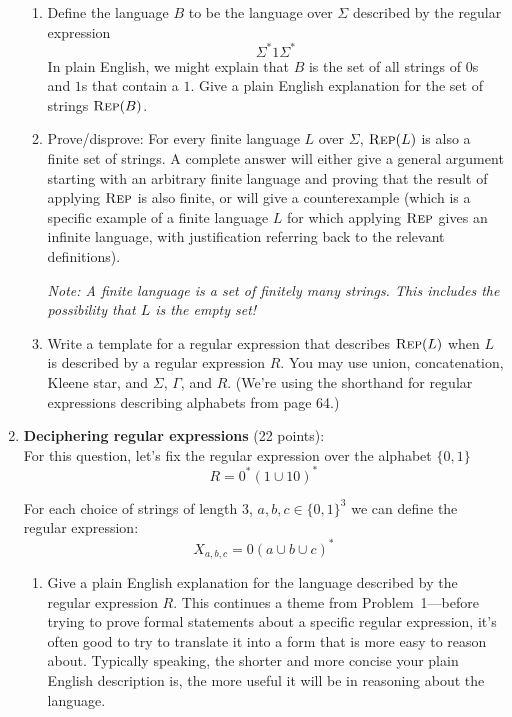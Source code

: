 \begin{enumerate}[wide, labelwidth=!, labelindent=0pt]
\begin{enumerate}
    \item\gradeCompleteFirst Define the language $B$ to 
    be the language over $\Sigma$ described by the regular expression 
    \[
    \Sigma^* 1 \Sigma^*
    \] 
    In plain English, we might explain that $B$ is the set of all 
    strings of $0$s and $1$s that contain a $1$. Give a plain English 
    explanation for the set of strings $\textsc{Rep}(B)$.
    
    \item\gradeCorrect Prove/disprove:
    For every finite language $L$ over $\Sigma$, $\textsc{Rep}(L)$ is also a finite
    set of strings.  A complete answer will either give a general
    argument starting with an arbitrary finite language and proving 
    that the result of applying $\textsc{Rep}$ is also finite, or will give a 
    counterexample (which is a specific example of a finite language 
    $L$ for which applying $\textsc{Rep}$ gives an infinite language, with 
    justification referring back to the relevant definitions).

    {\it Note: A finite language is a set of finitely many strings. 
    This includes the possibility that $L$ is the empty set!}

    \item\gradeComplete Write a template for a regular expression that describes $\textsc{Rep}(L)$
    when $L$ is described by a regular expression $R$.
    You may use union, concatenation, Kleene star, and 
    $\Sigma$, $\Gamma$, and $R$.  (We're using the shorthand for regular expressions
    describing alphabets from page 64.)

    \end{enumerate}

    \item \textbf{Deciphering regular expressions} (22 points): \\
    For this question, let's fix the regular expression over the alphabet $\{0,1\}$
    \[
    R = 0^* (1 \cup 10)^*
    \]

    For each choice of strings of length $3$, 
    $a, b, c \in \{0,1\}^3$ we can define the regular
    expression:
    \[
    X_{a,b,c} = 0 (a \cup b \cup c)^* 
    \]
    \begin{enumerate}
    \item \gradeComplete Give a plain English explanation for the language 
    described by the regular expression $R$. 
    This continues a theme from Problem~1---before trying to prove formal statements about a specific regular expression, it's often 
    good to try to translate it into a form that is more easy to reason about. 
    Typically speaking, the shorter and more concise your plain English 
    description is, the more useful it will be in reasoning about the language.
        

\end{enumerate}
\end{enumerate}
